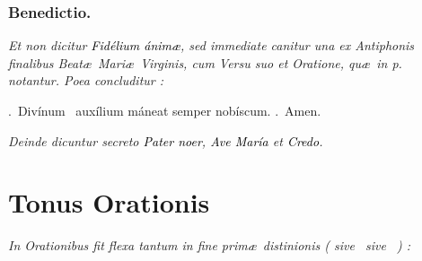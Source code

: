 \documentclass[12pt]{article} %
\newenvironment{rubric}{\vspace{2 mm}\color{benred8} \itshape \leftskip 0in \setlength{\parindent}{0.25in}}{\vspace{2 mm}}
\newenvironment{response}{\leftskip 0in \setlength{\parindent}{0in}}{\vspace{2 mm}}
\let\oldgresixstar\gresixstar
\renewcommand{\gresixstar}{\textcolor{benred8}{\oldgresixstar}}
\let\oldgredagger\gredagger
\renewcommand{\gredagger}{\textcolor{benred8}{\oldgredagger}}
\let\oldVbar\Vbar
\renewcommand{\Vbar}{\textcolor{benred8}{\oldVbar .}}
\let\oldRbar\Rbar
\renewcommand{\Rbar}{\textcolor{benred8}{\oldRbar .}}
\let\oldgrealtcross\grealtcross
\renewcommand{\grealtcross}{\textcolor{benred8}{\oldgrealtcross}}
\begin{document}
\vspace{1.5mm}

\subsubsection*{Benedictio.}

\gresetfirstlineaboveinitial{\small \textsc{ \textbf{\textcolor{benred8}{}}}}{\small \textsc{ \textbf{\textcolor{benred8}{}}}}

\vspace{1.5mm}

\begin{rubric}
Et non dicitur \textcolor{black}{\emph{Fid\'{e}lium \'{a}nim\ae}}, sed immediate canitur una ex Antiphonis finalibus Beat\ae\ Mari\ae\ Virginis, cum Versu suo et Oratione, qu\ae\ in p.~\pageref{sec:AntBMV} notantur. Poea concluditur :

\end{rubric}

\begin{response}
\Vbar\ Div\'{i}num \grealtcross\ aux\'{i}lium m\'{a}neat semper nob\'{i}scum. \Rbar\ Amen.

\end{response}

\begin{rubric}
Deinde dicuntur secreto \textcolor{black}{\emph{Pater noer}}, \textcolor{black}{\emph{Ave Mar\'{i}a}} et \textcolor{black}{\emph{Credo}}.

\end{rubric}

\newpage


\section*{Tonus Orationis}
\label{sec:TonusOrationis}

\thispagestyle{plain}



\vspace{1mm}

\begin{rubric}
In Orationibus fit flexa tantum in fine prim\ae\ distinionis ( sive \gredagger\ sive \gresixstar\ ) :

\end{rubric}
\end{document}
